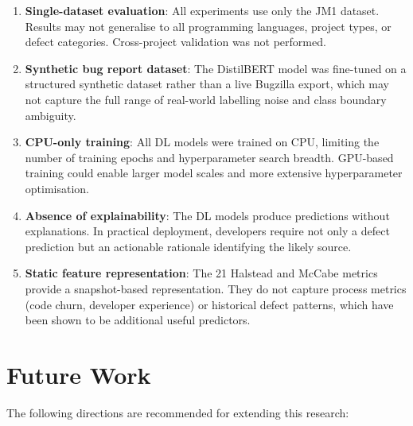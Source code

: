 \documentclass[12pt,a4paper,oneside]{report}
\begin{document}
\begin{enumerate}
  \item \textbf{Single-dataset evaluation}: All experiments use only the JM1 dataset. Results may not generalise to all programming languages, project types, or defect categories. Cross-project validation was not performed.

  \item \textbf{Synthetic bug report dataset}: The DistilBERT model was fine-tuned on a structured synthetic dataset rather than a live Bugzilla export, which may not capture the full range of real-world labelling noise and class boundary ambiguity.

  \item \textbf{CPU-only training}: All DL models were trained on CPU, limiting the number of training epochs and hyperparameter search breadth. GPU-based training could enable larger model scales and more extensive hyperparameter optimisation.

  \item \textbf{Absence of explainability}: The DL models produce predictions without explanations. In practical deployment, developers require not only a defect prediction but an actionable rationale identifying the likely source.

  \item \textbf{Static feature representation}: The 21 Halstead and McCabe metrics provide a snapshot-based representation. They do not capture process metrics (code churn, developer experience) or historical defect patterns, which have been shown to be additional useful predictors.
\end{enumerate}

\section{Future Work}

The following directions are recommended for extending this research:
\end{document}
